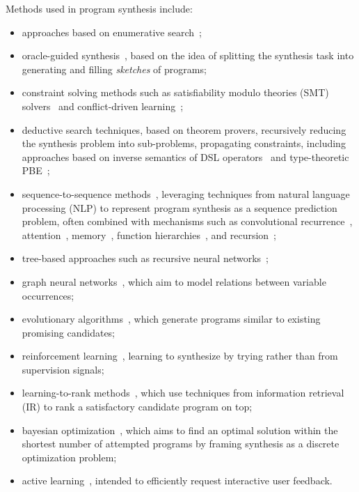 \documentclass{article}
\begin{document}
Methods used in program synthesis include:
\begin{itemize}
    \item approaches based on enumerative search~\citep{akiba2013calibrating,alur2013syntax,alur2016sygus};
    \item oracle-guided synthesis~\citep{solar2008program}, based on the idea of splitting the synthesis task into generating and filling \emph{sketches} of programs;
    \item constraint solving methods such as satisfiability modulo theories (SMT) solvers~\citep{rosette,architecture} and conflict-driven learning~\citep{feng2018program,hornclauses};
    \item deductive search techniques, based on theorem provers, recursively reducing the synthesis problem into sub-problems, propagating constraints, including approaches based on inverse semantics of DSL operators~\citep{flashmeta,prose} and type-theoretic PBE~\citep{myth,synquid};
    \item sequence-to-sequence methods~\citep{npi,neuralmachinetranslation,alphanpi}, leveraging techniques from natural language processing (NLP) to represent program synthesis as a sequence prediction problem, often combined with mechanisms such as convolutional recurrence~\citep{neuralgpu}, attention~\citep{nmt,ptrnets,structuredattention}, memory~\citep{ntm,neuralram,neuralprogrammer,hierarchicalmemory}, function hierarchies~\citep{npi,npl}, and recursion~\citep{cai2017making};
    \item tree-based approaches such as recursive neural networks~\cite{nsps};
    \item graph neural networks~\citep{allamanis2017learning,brockschmidt2018generative}, which aim to model relations between variable occurrences;
    \item evolutionary algorithms~\citep{koza1994genetic}, which generate programs similar to existing promising candidates;
    \item reinforcement learning~\citep{chen2017towards,bunel2018leveraging,xu2019neural,camacho2019towards}, learning to synthesize by trying rather than from supervision signals;
    \item learning-to-rank methods~\citep{singh2015predicting}, which use techniques from information retrieval (IR) to rank a satisfactory candidate program on top;
    \item bayesian optimization~\citep{looks2005learning,verma2018programmatically}, which aims to find an optimal solution within the shortest number of attempted programs by framing synthesis as a discrete optimization problem;
    \item active learning~\citep{shen2019using}, intended to efficiently request interactive user feedback.
\end{itemize}
\end{document}
